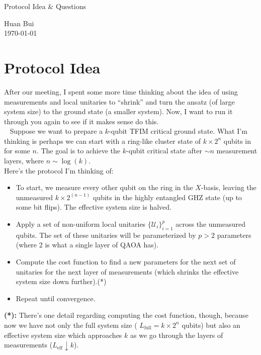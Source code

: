 \documentclass{article}
\theoremstyle{definition}
\begin{document}
	\begin{center}
		\huge{Protocol Idea \& Questions}
	\end{center}	
	\begin{center}
		Huan Bui \\ \today
	\end{center}


\section{Protocol Idea }

After our meeting, I spent some more time thinking about the idea of using measurements and local unitaries to ``shrink'' and turn the ansatz (of large system size) to the ground state (a smaller system). Now, I want to run it through you again to see if it makes sense do this. \\

 
\noindent Suppose we want to prepare a $k$-qubit TFIM critical ground state. What I'm thinking is perhaps we can start with a ring-like cluster state of $k\times2^n$ qubits in for some $n$. The goal is to achieve the $k$-qubit critical state after $\sim n$ measurement layers, where $n \sim \log(k)$. \\


\noindent Here's the protocol I'm thinking of:
\begin{itemize}
	\item To start, we measure every other qubit on the ring in the $X$-basis, leaving the unmeasured $k\times2^{(n-1)}$ qubits in the highly entangled GHZ state (up to some bit flips). The effective system size is halved.
	
	\item Apply a set of non-uniform local unitaries $\{\mathcal{U}_i\}_{i=1}^p$ across the unmeasured qubits. The set of these unitaries will be parameterized by $p>2$ parameters (where 2 is what a single layer of QAOA has).
	
	\item Compute the cost function to find a new parameters for the next set of unitaries for the next layer of measurements (which shrinks the effective system size down further).(*)
	

	\item Repeat until convergence. 
\end{itemize}


  
\noindent \textbf{(*):} There's one detail regarding computing the cost function, though, because now we have not only the full system size ( $L_{\text{full}}=k\times 2^n$ qubits) but also an effective system size  which approaches $k$ as we go through the layers of measurements ($L_{\text{eff}} \downarrow k$). \\
 
\end{document}
